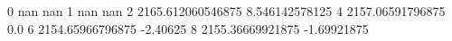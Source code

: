 0 nan nan
1 nan nan
2 2165.612060546875 8.546142578125
4 2157.06591796875 0.0
6 2154.65966796875 -2.40625
8 2155.36669921875 -1.69921875
